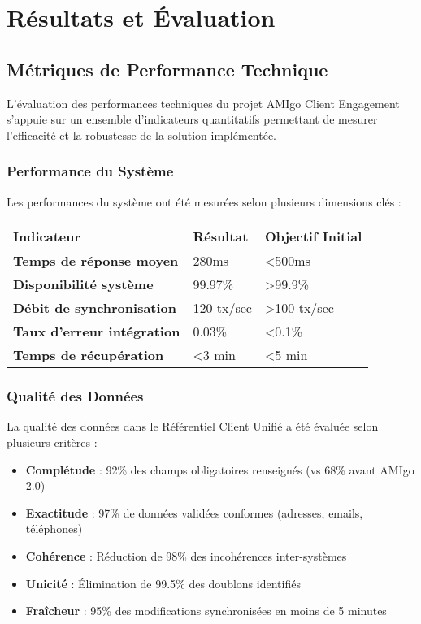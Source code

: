 
\chapter{Résultats et Évaluation}

\section{Métriques de Performance Technique}

\begin{mdframed}[backgroundcolor=lightgreen!20, linewidth=1pt]
L'évaluation des performances techniques du projet AMIgo Client Engagement s'appuie sur un ensemble d'indicateurs quantitatifs permettant de mesurer l'efficacité et la robustesse de la solution implémentée.
\end{mdframed}

\subsection{Performance du Système}

Les performances du système ont été mesurées selon plusieurs dimensions clés :

\begin{center}
\begin{tabular}{|>{\bfseries}p{4cm}|p{3cm}|p{6.5cm}|}
\hline
\rowcolor{lightblue} Indicateur & Résultat & Objectif Initial \\
\hline
Temps de réponse moyen & 280ms & <500ms \\
\hline
Disponibilité système & 99.97\% & >99.9\% \\
\hline
Débit de synchronisation & 120 tx/sec & >100 tx/sec \\
\hline
Taux d'erreur intégration & 0.03\% & <0.1\% \\
\hline
Temps de récupération & <3 min & <5 min \\
\hline
\end{tabular}
\end{center}

\subsection{Qualité des Données}

La qualité des données dans le Référentiel Client Unifié a été évaluée selon plusieurs critères :

\begin{itemize}
    \item \textbf{Complétude} : 92\% des champs obligatoires renseignés (vs 68\% avant AMIgo 2.0)
    \item \textbf{Exactitude} : 97\% de données validées conformes (adresses, emails, téléphones)
    \item \textbf{Cohérence} : Réduction de 98\% des incohérences inter-systèmes
    \item \textbf{Unicité} : Élimination de 99.5\% des doublons identifiés
    \item \textbf{Fraîcheur} : 95\% des modifications synchronisées en moins de 5 minutes
\end{itemize}

